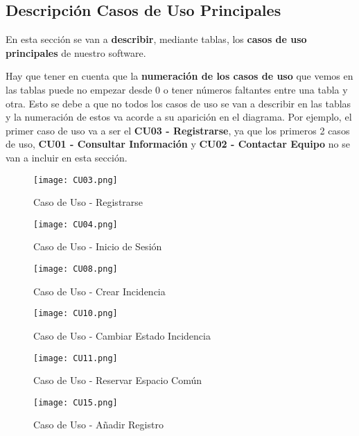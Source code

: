 \subsection{Descripción Casos de Uso Principales}
En esta sección se van a \textbf{describir}, mediante tablas, los \textbf{casos de uso principales} de nuestro software. 

Hay que tener en cuenta que la \textbf{numeración de los casos de uso} que vemos en las tablas puede no empezar desde 0 o tener números faltantes entre una tabla y otra. Esto se debe a que no todos los casos de uso se van a describir en las tablas y la numeración de estos va acorde a su aparición en el diagrama. Por ejemplo, el primer caso de uso va a ser el \textbf{CU03 - Registrarse}, ya que los primeros 2 casos de uso, \textbf{CU01 - Consultar Información} y \textbf{CU02 - Contactar Equipo} no se van a incluir en esta sección.

\begin{figure}[ht]
	\centering
	\texttt{[image: CU03.png]}
	\caption{Caso de Uso - Registrarse}
\end{figure}

\begin{figure}[H]
	\centering
	\texttt{[image: CU04.png]}
	\caption{Caso de Uso - Inicio de Sesión}
\end{figure}

\begin{figure}[H]
	\centering
	\texttt{[image: CU08.png]}
	\caption{Caso de Uso - Crear Incidencia}
\end{figure}

\begin{figure}[H]
	\centering
	\texttt{[image: CU10.png]}
	\caption{Caso de Uso - Cambiar Estado Incidencia}
\end{figure}

\begin{figure}[H]
	\centering
	\texttt{[image: CU11.png]}
	\caption{Caso de Uso - Reservar Espacio Común}
\end{figure}

\begin{figure}[H]
	\centering
	\texttt{[image: CU15.png]}
	\caption{Caso de Uso - Añadir Registro}
\end{figure}







\newpage

